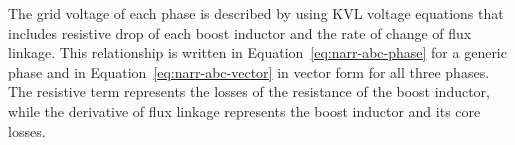 





The grid voltage of each phase is described by using KVL voltage equations that includes resistive drop of each boost inductor and the rate of change of flux linkage. This relationship is written in Equation~\eqref{eq:narr-abc-phase} for a generic phase and in Equation~\eqref{eq:narr-abc-vector} in vector form for all three phases. The resistive term represents the losses of the resistance of the boost inductor, while the derivative of flux linkage represents the boost inductor and its core losses.



